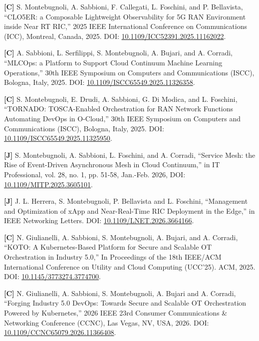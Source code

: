 \documentclass[a4paper,11pt]{article}
\begin{document}
{\begin{enumerate}[label={[\arabic*]}]
    \item \textbf{[C]} S. Montebugnoli, A. Sabbioni, F. Callegati, L. Foschini, and P. Bellavista, ``CLO5ER: a Composable Lightweight Observability for 5G RAN Environment inside Near RT RIC,'' 2025 IEEE International Conference on Communications (ICC), Montreal, Canada, 2025. DOI: \href{https://doi.org/10.1109/ICC52391.2025.11162022}{10.1109/ICC52391.2025.11162022}.

    \item \textbf{[C]} A. Sabbioni, L. Serfilippi, S. Montebugnoli, A. Bujari, and A. Corradi, ``MLCOps: a Platform to Support Cloud Continuum Machine Learning Operations,'' 30th IEEE Symposium on Computers and Communications (ISCC), Bologna, Italy, 2025. DOI: \href{https://doi.org/10.1109/ISCC65549.2025.11326358}{10.1109/ISCC65549.2025.11326358}.

    \item \textbf{[C]} S. Montebugnoli, E. Drudi, A. Sabbioni, G. Di Modica, and L. Foschini, ``TORNADO: TOSCA-Enabled Orchestration for RAN Network Functions Automating DevOps in O-Cloud,'' 30th IEEE Symposium on Computers and Communications (ISCC), Bologna, Italy, 2025. DOI: \href{https://doi.org/10.1109/ISCC65549.2025.11325950}{10.1109/ISCC65549.2025.11325950}.

    \item \textbf{[J]} S. Montebugnoli, A. Sabbioni, L. Foschini, and A. Corradi, ``Service Mesh: the Rise of Event-Driven Asynchronous Mesh in Cloud Continuum,'' in IT Professional, vol. 28, no. 1, pp. 51-58, Jan.-Feb. 2026, DOI: \href{https://doi.org/10.1109/MITP.2025.3605101}{10.1109/MITP.2025.3605101}.

    \item \textbf{[J]} J. L. Herrera, S. Montebugnoli, P. Bellavista and L. Foschini, ``Management and Optimization of xApp and Near-Real-Time RIC Deployment in the Edge,'' in IEEE Networking Letters. DOI: \href{https://doi.org/10.1109/LNET.2026.3664166}{10.1109/LNET.2026.3664166}.

    \item \textbf{[C]} N. Giulianelli, A. Sabbioni, S. Montebugnoli, A. Bujari, and A. Corradi, ``KOTO: A Kubernetes-Based Platform for Secure and Scalable OT Orchestration in Industry 5.0,'' In Proceedings of the 18th IEEE/ACM International Conference on Utility and Cloud Computing (UCC'25). ACM, 2025. DOI: \href{https://doi.org/10.1145/3773274.3774700}{10.1145/3773274.3774700}.

    \item \textbf{[C]} N. Giulianelli, A. Sabbioni, S. Montebugnoli, A. Bujari and A. Corradi, ``Forging Industry 5.0 DevOps: Towards Secure and Scalable OT Orchestration Powered by Kubernetes,'' 2026 IEEE 23rd Consumer Communications \& Networking Conference (CCNC), Las Vegas, NV, USA, 2026. DOI: \href{https://doi.org/10.1109/CCNC65079.2026.11366408}{10.1109/CCNC65079.2026.11366408}.


\end{enumerate}}
\end{document}
